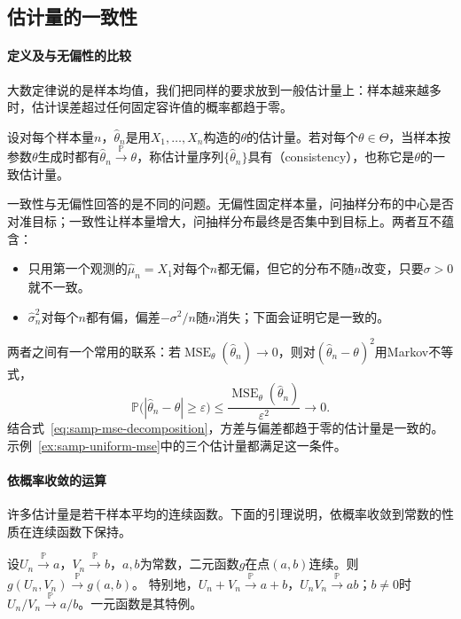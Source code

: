\subsection{估计量的一致性}
\label{sec:samp-consistency}

\paragraph{定义及与无偏性的比较}
大数定律说的是样本均值，我们把同样的要求放到一般估计量上：样本越来越多时，估计误差超过任何固定容许值的概率都趋于零。

\begin{definition}[一致性]
\label{def:samp-consistency}
设对每个样本量$n$，$\hat\theta_n$是用$X_1,\dots,X_n$构造的$\theta$的估计量。若对每个$\theta\in\Theta$，当样本按参数$\theta$生成时都有$\hat\theta_n\xrightarrow{\mathbb{P}}\theta$，称估计量序列$\{\hat\theta_n\}$具有（consistency），也称它是$\theta$的一致估计量。
\end{definition}

一致性与无偏性回答的是不同的问题。无偏性固定样本量，问抽样分布的中心是否对准目标；一致性让样本量增大，问抽样分布最终是否集中到目标上。两者互不蕴含：
\begin{itemize}
  \item 只用第一个观测的$\hat\mu_n=X_1$对每个$n$都无偏，但它的分布不随$n$改变，只要$\sigma>0$就不一致。
  \item $\hat\sigma_n^2$对每个$n$都有偏，偏差$-\sigma^2/n$随$n$消失；下面会证明它是一致的。
\end{itemize}
两者之间有一个常用的联系：若$\operatorname{MSE}_\theta(\hat\theta_n)\to0$，则对$(\hat\theta_n-\theta)^2$用Markov不等式，
\[
  \mathbb{P}\bigl(|\hat\theta_n-\theta|\geq\varepsilon\bigr)\leq\frac{\operatorname{MSE}_\theta(\hat\theta_n)}{\varepsilon^2}\to0.
\]
结合式~\eqref{eq:samp-mse-decomposition}，方差与偏差都趋于零的估计量是一致的。示例~\ref{ex:samp-uniform-mse}中的三个估计量都满足这一条件。

\paragraph{依概率收敛的运算}
许多估计量是若干样本平均的连续函数。下面的引理说明，依概率收敛到常数的性质在连续函数下保持。

\begin{lemma}[连续函数保持依概率收敛]
\label{lem:samp-continuous-mapping}
设$U_n\xrightarrow{\mathbb{P}}a$，$V_n\xrightarrow{\mathbb{P}}b$，$a,b$为常数，二元函数$g$在点$(a,b)$连续。则$g(U_n,V_n)\xrightarrow{\mathbb{P}}g(a,b)$。
特别地，$U_n+V_n\xrightarrow{\mathbb{P}}a+b$，$U_nV_n\xrightarrow{\mathbb{P}}ab$；$b\neq0$时$U_n/V_n\xrightarrow{\mathbb{P}}a/b$。一元函数是其特例。
\end{lemma}

